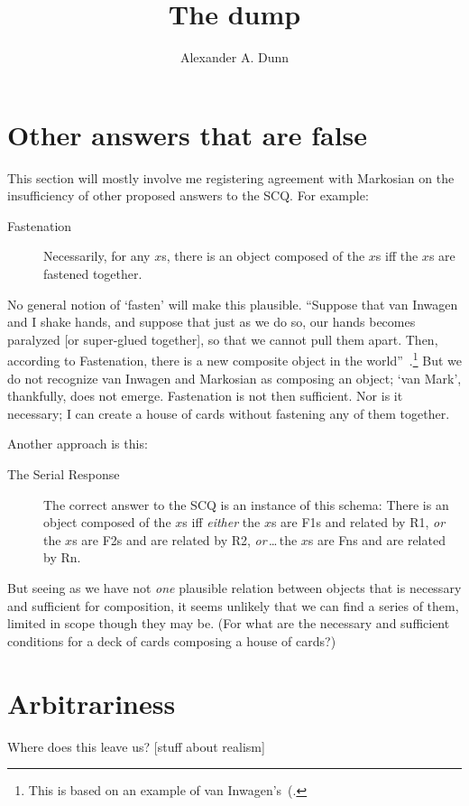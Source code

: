 \documentclass[11pt]{article}
\title{The dump}
\author{Alexander A. Dunn}
\begin{document}
\maketitle
\begin{spacing}{1}


\section{Other answers that are false}
This section will mostly involve me registering agreement with
Markosian on the insufficiency of other proposed answers to the
SCQ. For example:
\begin{description}
	\item[Fastenation] Necessarily, for any $x$s, there is an
          object composed of the $x$s iff the $x$s are fastened
          together.~\citep[223]{markosian1998a}
\end{description}
No general notion of `fasten' will make this plausible. ``Suppose that
van Inwagen and I shake hands, and suppose that just as we do so, our
hands becomes paralyzed [or super-glued together], so that we cannot
pull them apart. Then, according to Fastenation, there is a new
composite object in the
world''~\citep[224]{markosian1998a}.\footnote{This is based on an
  example of van Inwagen's~(\citeyear[57--58]{inwagen1995}.} But we do
not recognize van Inwagen and Markosian as composing an object; `van
Mark', thankfully, does not emerge. Fastenation is not then
sufficient. Nor is it necessary; I can create a house of cards without
fastening any of them together.

Another approach is this:
\begin{description}
	\item[The Serial Response] The correct answer to the SCQ is an
          instance of this schema: There is an object composed of the
          $x$s iff {\em either} the $x$s are F1s and related by R1,
          {\em or} the $x$s are F2s and are related by R2, {\em
            or}\,\ldots\,the $x$s are Fns and are related by
          Rn.~\citep[230]{markosian1998a}
\end{description}
But seeing as we have not {\em one} plausible relation between objects
that is necessary and sufficient for composition, it seems unlikely
that we can find a series of them, limited in scope though they may
be. (For what are the necessary and sufficient conditions for a deck
of cards composing a house of cards?)

\section{Arbitrariness}
Where does this leave us? [stuff about realism]


\end{spacing}
\end{document}
